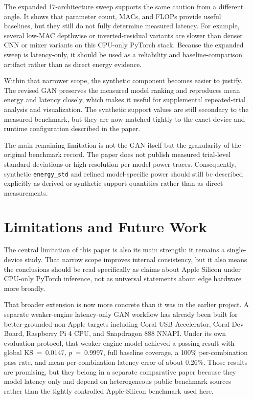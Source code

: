 \documentclass[11pt]{article}
\begin{document}
The expanded 17-architecture sweep supports the same caution from a different
angle. It shows that parameter count, MACs, and FLOPs provide useful baselines,
but they still do not fully determine measured latency. For example, several
low-MAC depthwise or inverted-residual variants are slower than denser CNN or
mixer variants on this CPU-only PyTorch stack. Because the expanded sweep is
latency-only, it should be used as a reliability and baseline-comparison
artifact rather than as direct energy evidence.

Within that narrower scope, the synthetic component becomes easier to justify.
The revised GAN preserves the measured model ranking and reproduces mean energy
and latency closely, which makes it useful for supplemental repeated-trial
analysis and visualization. The synthetic support values are still secondary to
the measured benchmark, but they are now matched tightly to the exact device and
runtime configuration described in the paper.

The main remaining limitation is not the GAN itself but the granularity of the
original benchmark record. The paper does not publish measured trial-level
standard deviations or high-resolution per-model power traces. Consequently,
synthetic \texttt{energy\_std} and refined model-specific power should still be
described explicitly as derived or synthetic support quantities rather than as
direct measurements.

\section{Limitations and Future Work}
The central limitation of this paper is also its main strength: it remains a
single-device study. That narrow scope improves internal consistency, but it
also means the conclusions should be read specifically as claims about Apple
Silicon under CPU-only PyTorch inference, not as universal statements about edge
hardware more broadly.

That broader extension is now more concrete than it was in the earlier project.
A separate weaker-engine latency-only GAN workflow has already been built for
better-grounded non-Apple targets including Coral USB Accelerator, Coral Dev
Board, Raspberry Pi 4 CPU, and Snapdragon 888 NNAPI. Under its own evaluation
protocol, that weaker-engine model achieved a passing result with global
KS~=~0.0147, $p$~=~0.9997, full baseline coverage, a 100\% per-combination pass
rate, and mean per-combination latency error of about 0.26\%. Those results are
promising, but they belong in a separate comparative paper because they model
latency only and depend on heterogeneous public benchmark sources rather than
the tightly controlled Apple-Silicon benchmark used here.
\end{document}
